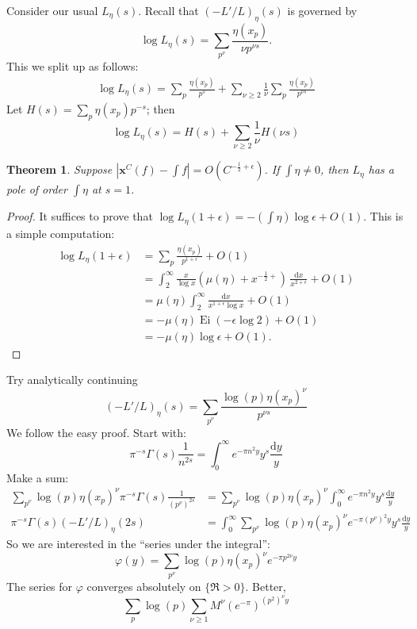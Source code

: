 \documentclass{article}
\DeclareMathOperator{\Ei}{Ei}
\newcommand{\bx}{\boldsymbol{x}}
\newcommand{\dd}{\mathrm{d}}
\newtheorem{theorem}[subsection]{Theorem}
\theoremstyle{definition}
\begin{document}
Consider our usual $L_\eta(s)$. Recall that $(-L'/L)_\eta(s)$ is governed by 
\[
	\log L_\eta(s) = \sum_{p^\nu} \frac{\eta(x_p)}{\nu p^{\nu s}} .
\]
This we split up as follows:
\begin{align*}
	\log L_\eta(s) = \sum_p \frac{\eta(x_p)}{p^s} + \sum_{\nu\geqslant 2}\frac{1}{\nu} \sum_p \frac{\eta(x_p)}{p^{\nu s}}
\end{align*}
Let $H(s) = \sum_p \eta(x_p) p^{-s}$; then 
\[
	\log L_\eta(s) = H(s) + \sum_{\nu\geqslant 2} \frac{1}{\nu} H(\nu s)
\]

\begin{theorem}
Suppose $|\bx^C(f)-\int f| = O(C^{-\frac 1 2+\epsilon})$. If $\int \eta\ne 0$, 
then $L_\eta$ has a pole of order $\int\eta$ at $s=1$. 
\end{theorem}
\begin{proof}
It suffices to prove that 
$\log L_\eta(1+\epsilon) = -(\int\eta) \log\epsilon+O(1)$. This is a simple 
computation:
\begin{align*}
	\log L_\eta(1+\epsilon) 
		&= \sum_p \frac{\eta(x_p)}{p^{1+\epsilon}} + O(1) \\
		&= \int_2^\infty \frac{x}{\log x} (\mu(\eta)+x^{-\frac 1 2+})\, \frac{\dd x}{x^{2+\epsilon}} + O(1) \\
		&= \mu(\eta) \int_2^\infty \frac{\dd x}{x^{1+\epsilon}\log x} + O(1) \\
		&= -\mu(\eta) \Ei(-\epsilon \log 2) + O(1) \\
		&= -\mu(\eta) \log \epsilon + O(1) .
\end{align*}
\end{proof}

Try analytically continuing 
\[
	(-L'/L)_\eta(s) = \sum_{p^\nu} \frac{\log(p)\eta(x_p)^\nu}{p^{\nu s}}
\]
We follow the easy proof. Start with:
\[
	\pi^{-s} \Gamma(s) \frac{1}{n^{2s}} = \int_0^\infty e^{-\pi n^2 y} y^s \frac{\dd y}{y}
\]
Make a sum:
\begin{align*}
	\sum_{p^\nu} \log(p) \eta(x_p)^\nu \pi^{-s} \Gamma(s) \frac{1}{(p^\nu)^{2s}}
		&= \sum_{p^\nu} \log(p) \eta(x_p)^\nu \int_0^\infty e^{-\pi n^2 y} y^s \frac{\dd y}{y} \\
	\pi^{-s} \Gamma(s) (-L'/L)_\eta(2s) 
		&=\int_0^\infty \sum_{p^\nu} \log(p) \eta(x_p)^\nu e^{-\pi (p^\nu)^2 y} y^s \frac{\dd y}{y}
\end{align*}
So we are interested in the ``series under the integral'':
\[
	\varphi(y) = \sum_{p^\nu} \log(p) \eta(x_p)^\nu e^{-\pi p^{2\nu} y} 
\]
The series for $\varphi$ converges absolutely on $\{\Re>0\}$. Better, 
\[
	\sum_p\log(p)\sum_{\nu\geqslant 1}  M^\nu (e^{-\pi})^{(p^2)^\nu y}
\]
\end{document}
